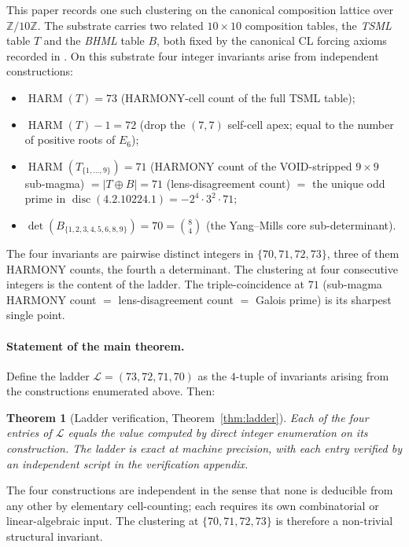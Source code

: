 \documentclass[11pt,reqno]{amsart}
\newtheorem{theorem}{Theorem}[section]
\theoremstyle{definition}
\newcommand{\Z}{\mathbb{Z}}
\DeclareMathOperator{\HARM}{HARM}
\DeclareMathOperator{\disc}{disc}
\begin{document}
This paper records one such clustering on the canonical composition
lattice over $\Z/10\Z$. The substrate carries two related
$10 \times 10$ composition tables, the \emph{TSML} table $T$ and the
\emph{BHML} table $B$, both fixed by the canonical CL forcing axioms
recorded in \cite{Sanders2026CLAxioms}. On this substrate four integer
invariants arise from independent constructions:
\begin{itemize}[leftmargin=*]
\item $\HARM(T) = 73$ (HARMONY-cell count of the full TSML table);
\item $\HARM(T) - 1 = 72$ (drop the $(7,7)$ self-cell apex; equal to
  the number of positive roots of $E_6$);
\item $\HARM(T_{\{1,\ldots,9\}}) = 71$ (HARMONY count of the
  VOID-stripped $9 \times 9$ sub-magma) $= |T \oplus B| = 71$
  (lens-disagreement count) $=$ the unique odd prime in
  $\disc(4.2.10224.1) = -2^{4}\cdot 3^{2}\cdot 71$;
\item $\det(B_{\{1,2,3,4,5,6,8,9\}}) = 70 = \binom{8}{4}$ (the
  Yang--Mills core sub-determinant).
\end{itemize}

The four invariants are pairwise distinct integers in
$\{70, 71, 72, 73\}$, three of them HARMONY counts, the fourth a
determinant. The clustering at four consecutive integers is the
content of the ladder. The triple-coincidence at $71$
(sub-magma HARMONY count $=$ lens-disagreement count $=$ Galois prime)
is its sharpest single point.

\paragraph{Statement of the main theorem.}

Define the ladder $\mathcal{L} = (73, 72, 71, 70)$ as the
$4$-tuple of invariants arising from the constructions enumerated
above. Then:

\begin{theorem}[Ladder verification, Theorem~\ref{thm:ladder}]
Each of the four entries of $\mathcal{L}$ equals the value computed
by direct integer enumeration on its construction. The ladder is
exact at machine precision, with each entry verified by an
independent script in the verification appendix.
\end{theorem}

The four constructions are independent in the sense that none is
deducible from any other by elementary cell-counting; each requires
its own combinatorial or linear-algebraic input. The clustering at
$\{70, 71, 72, 73\}$ is therefore a non-trivial structural invariant.
\end{document}
